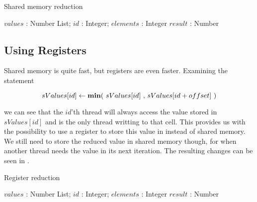 \begin{algorithm}
  \caption{Shared memory reduction}
  \label{alg:sharedReduct}
  \begin{algorithmic}
              {$values$ : Number List; $id$ : Integer; $elements$ : Integer}
              {$result$ : Number}
              {
                \SYNC
                  \ENDIF
                  \SYNC
                \ENDWHILE
                \ENDIF
              }
  \end{algorithmic}
\end{algorithm}

\subsection{Using Registers}

Shared memory is quite fast, but registers are even faster. Examining the
statement

\begin{displaymath}
  sValues[id] \leftarrow \text{\textbf{min}$($ $sValues[id]$ , $sValues[id + offset]$ $)$}
\end{displaymath}

we can see that the $id$'th thread will always access the value stored in
$sValues[id]$ and is the only thread writting to that cell. This provides us
with the possibility to use a register to store this value in instead of shared
memory. We still need to store the reduced value in shared memory though, for
when another thread needs the value in its next iteration. The resulting changes
can be seen in .

\begin{algorithm}
  \caption{Register reduction}
  \label{alg:registerReduct}
  \begin{algorithmic}
              {$values$ : Number List; $id$ : Integer; $elements$ : Integer}
              {$result$ : Number}
              {
                \SYNC
                  \ENDIF
                  \SYNC
                \ENDWHILE
                \ENDIF
              }
  \end{algorithmic}
\end{algorithm}



